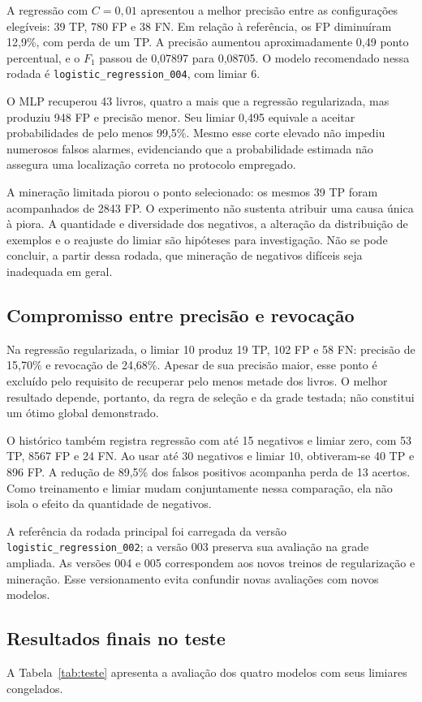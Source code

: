\documentclass[12pt,a4paper,twocolumn]{article}
\begin{document}
A regressão com $C=0{,}01$ apresentou a melhor precisão entre as configurações elegíveis: 39 TP, 780 FP e 38 FN. Em relação à referência, os FP diminuíram 12,9\%, com perda de um TP. A precisão aumentou aproximadamente 0,49 ponto percentual, e o $F_1$ passou de 0,07897 para 0,08705. O modelo recomendado nessa rodada é \texttt{logistic\_regression\_004}, com limiar 6.

O MLP recuperou 43 livros, quatro a mais que a regressão regularizada, mas produziu 948 FP e precisão menor. Seu limiar 0,495 equivale a aceitar probabilidades de pelo menos 99,5\%. Mesmo esse corte elevado não impediu numerosos falsos alarmes, evidenciando que a probabilidade estimada não assegura uma localização correta no protocolo empregado.

A mineração limitada piorou o ponto selecionado: os mesmos 39 TP foram acompanhados de 2843 FP. O experimento não sustenta atribuir uma causa única à piora. A quantidade e diversidade dos negativos, a alteração da distribuição de exemplos e o reajuste do limiar são hipóteses para investigação. Não se pode concluir, a partir dessa rodada, que mineração de negativos difíceis seja inadequada em geral.

\subsection{Compromisso entre precisão e revocação}
Na regressão regularizada, o limiar 10 produz 19 TP, 102 FP e 58 FN: precisão de 15,70\% e revocação de 24,68\%. Apesar de sua precisão maior, esse ponto é excluído pelo requisito de recuperar pelo menos metade dos livros. O melhor resultado depende, portanto, da regra de seleção e da grade testada; não constitui um ótimo global demonstrado.

O histórico também registra regressão com até 15 negativos e limiar zero, com 53 TP, 8567 FP e 24 FN. Ao usar até 30 negativos e limiar 10, obtiveram-se 40 TP e 896 FP. A redução de 89,5\% dos falsos positivos acompanha perda de 13 acertos. Como treinamento e limiar mudam conjuntamente nessa comparação, ela não isola o efeito da quantidade de negativos.

A referência da rodada principal foi carregada da versão \texttt{logistic\_regression\_002}; a versão 003 preserva sua avaliação na grade ampliada. As versões 004 e 005 correspondem aos novos treinos de regularização e mineração. Esse versionamento evita confundir novas avaliações com novos modelos.

\subsection{Resultados finais no teste}
A Tabela~\ref{tab:teste} apresenta a avaliação dos quatro modelos com seus limiares congelados.
\end{document}
